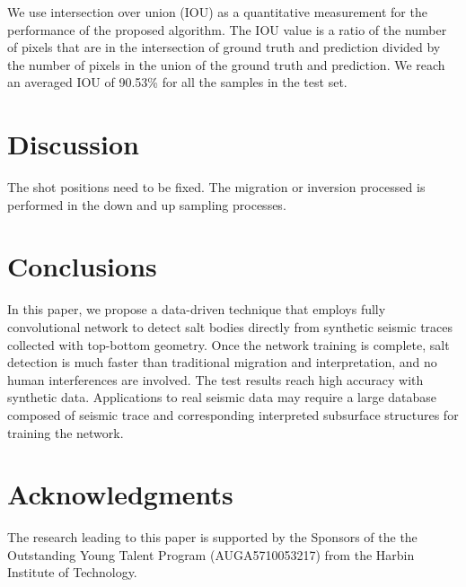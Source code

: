 \documentclass{segabs}
\begin{document}
We use intersection over union (IOU) as a quantitative measurement for the performance of the proposed algorithm. The IOU value is a ratio of the number of pixels that are in the intersection of ground truth and prediction divided by the number of pixels in the union of the ground truth and prediction.
We reach an averaged IOU of 90.53\% for all the samples in the test set.
\section{Discussion}
The shot positions need to be fixed.
The migration or inversion processed is performed in the down and up sampling processes. 


\section{Conclusions}
In this paper, we propose a data-driven technique that employs fully convolutional network to detect salt bodies directly from synthetic seismic traces collected with top-bottom geometry. Once the network training is complete, salt detection is much faster than traditional migration and interpretation, and no human interferences are involved. The test results reach high accuracy with synthetic data. Applications to real seismic data may require a large database composed of seismic trace and corresponding interpreted subsurface structures for training the network.


\section{Acknowledgments}

The research leading to this paper is supported by the Sponsors of the
the Outstanding Young Talent Program (AUGA5710053217) from the Harbin Institute of Technology. 

\newpage


\end{document}
